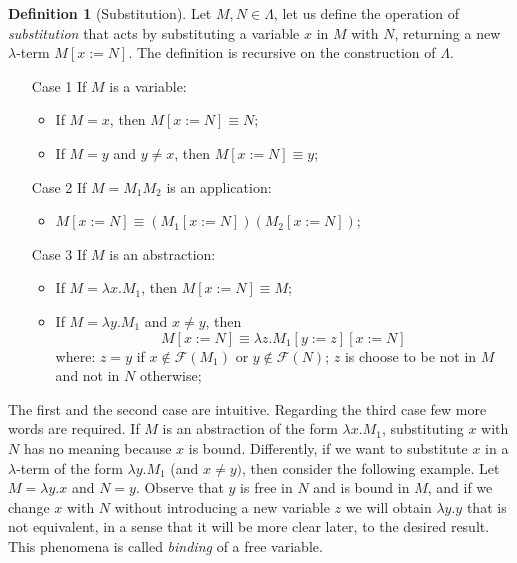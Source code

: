 \documentclass[a4paper,11pt]{article}
\theoremstyle{definition}
\newtheorem{defn}{Definition}
\newcommand{\FF}{\mathcal{F}}
\begin{document}
\begin{defn}[Substitution]
  \label{def:subs}
  Let $M,N\in\Lambda$, let us define the operation of \textit{substitution}
  that acts by substituting a variable $x$ in $M$ with $N$, returning a new 
  $\lambda$-term $M[x:=N]$. The
  definition is recursive on the construction of $\Lambda$.
  \begin{itemize}
    \item[{Case 1}] If $M$ is a variable:
      \begin{itemize}
        \item If $M=x$, then $M[x:=N]\equiv N$;
        \item If $M=y$ and $y\ne x$, then $M[x:=N]\equiv y$;
      \end{itemize}
    \item[Case 2] If $M=M_1M_2$ is an application:
      \begin{itemize}
        \item $M[x:=N]\equiv (M_1[x:=N])(M_2[x:=N])$; 
      \end{itemize}
    \item[Case 3] If $M$ is an abstraction:
      \begin{itemize}
        \item If $M=\lambda x.M_1$, then $M[x:=N] \equiv M$;
        \item If $M =\lambda y.M_1$ and $x\ne y$, then
          \[
            M[x:=N] \equiv\lambda z.M_1[y:=z][x:=N]
          \]
          where: $z=y$ if $x\not\in\FF(M_1)$ or $y\not\in\FF(N)$; 
          $z$ is choose to be not in $M$ and not in $N$ otherwise;
      \end{itemize}
  \end{itemize}
\end{defn}

The first and the second case are intuitive. Regarding the third case few
more words are required. If $M$ is an abstraction of the form $\lambda
x.M_1$, substituting $x$ with $N$ has no meaning because $x$ is bound.
Differently, if we want to substitute $x$ in a $\lambda$-term of the form
$\lambda y.M_1$ (and $x\ne y)$, then consider the following example. Let
$M=\lambda y.x$ and $N=y$. Observe that $y$ is free in $N$ and is bound in $M$,
and if we change $x$ with $N$ without introducing a new variable $z$ we will
obtain $\lambda y.y$ that is not equivalent, in a sense that it will be more
clear later, to the desired result. This phenomena is called \textit{binding}
of a free variable.
\end{document}

